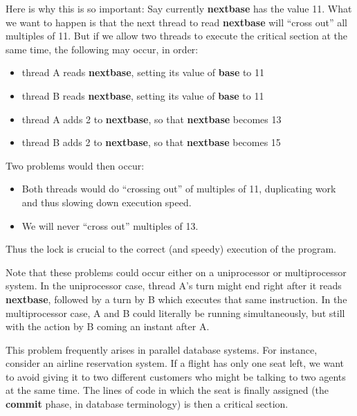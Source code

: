 Here is why this is so important:  Say currently {\bf nextbase} has the
value 11.  What we want to happen is that the next thread to read {\bf
nextbase} will ``cross out'' all multiples of 11.  But if we allow
two threads to execute the critical section at the same time, the
following may occur, in order:

\begin{itemize}

\item thread A reads {\bf nextbase}, setting its value of {\bf base} to
11

\item thread B reads {\bf nextbase}, setting its value of {\bf base} to
11

\item thread A adds 2 to {\bf nextbase}, so that {\bf nextbase} becomes
13

\item thread B adds 2 to {\bf nextbase}, so that {\bf nextbase} becomes
15

\end{itemize}

Two problems would then occur:

\begin{itemize}

\item Both threads would do ``crossing out'' of multiples of 11,
duplicating work and thus slowing down execution speed.

\item We will never ``cross out'' multiples of 13.

\end{itemize}

Thus the lock is crucial to the correct (and speedy) execution of the
program.

Note that these problems could occur either on a uniprocessor or
multiprocessor system.  In the uniprocessor case, thread A's turn might
end right after it reads {\bf nextbase}, followed by a turn by B which
executes that same instruction.  In the multiprocessor case, A and B
could literally be running simultaneously, but still with the action by
B coming an instant after A.

This problem frequently arises in parallel database systems.  For
instance, consider an airline reservation system. If a flight has only
one seat left, we want to avoid giving it to two different customers who
might be talking to two agents at the same time. The lines of code in
which the seat is finally assigned (the \textbf{commit} phase, in
database terminology) is then a critical section.

